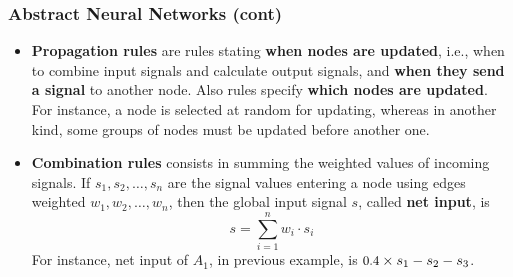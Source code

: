 %
\begin{frame}
\frametitle{Abstract Neural Networks (cont)}

\begin{itemize}

  \item \textbf{Propagation rules} are rules stating \textbf{when
    nodes are updated}, i.e., when to combine input signals and
  calculate output signals, and \textbf{when they send a signal} to
  another node. Also rules specify \textbf{which nodes are
    updated}. For instance, a node is selected at random for updating,
  whereas in another kind, some groups of nodes must be updated before
  another one.

  \item \textbf{Combination rules} consists in summing the
  weighted values of incoming signals. If $s_1, s_2, \dots, s_n$ are
  the signal values entering a node using edges weighted $w_1, w_2,
  \dots, w_n$, then the global input signal $s$, called \textbf{net
  input}, is \[s = \sum_{i=1}^{n}{w_i \cdot s_i}\] For
  instance, net input of $A_1$, in previous example, is \(\text{\small
  0.4} \times s_1 - s_2 - s_3\).

\end{itemize}

\end{frame}


